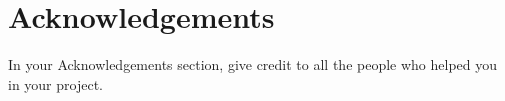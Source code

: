 \documentclass[]{UCD_CS_FYP_Report}
\begin{document}
% 


\chapter*{Acknowledgements}
In your Acknowledgements section, give credit to all the people who helped you in your project.


\printbibliography


\end{document}
